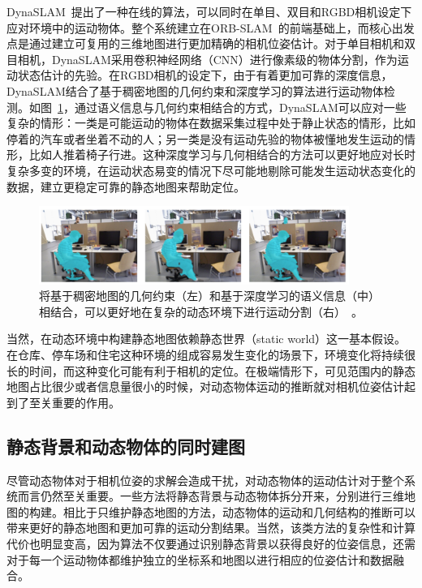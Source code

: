 DynaSLAM~\cite{DynaSLAM}提出了一种在线的算法，可以同时在单目、双目和RGBD相机设定下应对环境中的运动物体。整个系统建立在ORB-SLAM~\cite{orbslam2}的前端基础上，而核心出发点是通过建立可复用的三维地图进行更加精确的相机位姿估计。对于单目相机和双目相机，DynaSLAM采用卷积神经网络（CNN）进行像素级的物体分割，作为运动状态估计的先验。在RGBD相机的设定下，由于有着更加可靠的深度信息，DynaSLAM结合了基于稠密地图的几何约束和深度学习的算法进行运动物体检测。如图~\ref{fig:dynaSLAM}，通过语义信息与几何约束相结合的方式，DynaSLAM可以应对一些复杂的情形：一类是可能运动的物体在数据采集过程中处于静止状态的情形，比如停着的汽车或者坐着不动的人；另一类是没有运动先验的物体被懂地发生运动的情形，比如人推着椅子行进。这种深度学习与几何相结合的方法可以更好地应对长时复杂多变的环境，在运动状态易变的情况下尽可能地剔除可能发生运动状态变化的数据，建立更稳定可靠的静态地图来帮助定位。

\begin{figure}[!htbp]
	\centering
	\includegraphics[width=0.9\textwidth]{figs/2-1/dynaSLAM.jpeg}
	\caption{将基于稠密地图的几何约束（左）和基于深度学习的语义信息（中）相结合，可以更好地在复杂的动态环境下进行运动分割（右）~\cite{DynaSLAM}。}
	\label{fig:dynaSLAM}
\end{figure}

当然，在动态环境中构建静态地图依赖静态世界（static world）这一基本假设。在仓库、停车场和住宅这种环境的组成容易发生变化的场景下，环境变化将持续很长的时间，而这种变化可能有利于相机的定位。在极端情形下，可见范围内的静态地图占比很少或者信息量很小的时候，对动态物体运动的推断就对相机位姿估计起到了至关重要的作用。

\subsection{静态背景和动态物体的同时建图}
\label{subsec:static_and_dynamic}
尽管动态物体对于相机位姿的求解会造成干扰，对动态物体的运动估计对于整个系统而言仍然至关重要。一些方法将静态背景与动态物体拆分开来，分别进行三维地图的构建。相比于只维护静态地图的方法，动态物体的运动和几何结构的推断可以带来更好的静态地图和更加可靠的运动分割结果。当然，该类方法的复杂性和计算代价也明显变高，因为算法不仅要通过识别静态背景以获得良好的位姿信息，还需对于每一个运动物体都维护独立的坐标系和地图以进行相应的位姿估计和数据融合。

